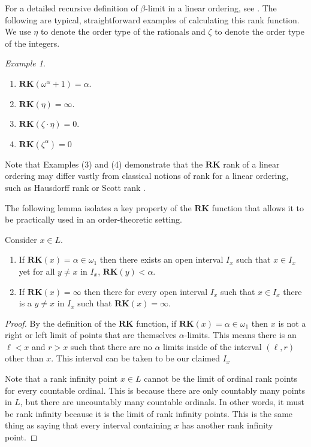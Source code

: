 \documentclass[11pt]{amsart}
\theoremstyle{remark}
\newtheorem{example}[thm]{Example}
\def\RK{\textbf{RK}}
\begin{document}
For a detailed recursive definition of $\beta$-limit in a linear ordering, see \cite[Chapter II.4]{MBook}. 
The following are typical, straightforward examples of calculating this rank function.
We use $\eta$ to denote the order type of the rationals and $\zeta$ to denote the order type of the integers.

\begin{example}

\begin{enumerate}
	\item $\RK(\omega^\alpha+1)=\alpha$.
	\item $\RK(\eta)=\infty$.
	\item $\RK(\zeta\cdot\eta) = 0$.
        \item $\RK(\zeta^\alpha)=0$
\end{enumerate}
\end{example}

Note that Examples (3) and (4) demonstrate that the $\RK$ rank of a linear ordering may differ vastly from classical notions of rank for a linear ordering, such as Hausdorff rank or Scott rank \cite{GR24}.

The following lemma isolates a key property of the $\RK$ function that allows it to be practically used in an order-theoretic setting.

\begin{lemma}\label{lem:RkTechnical}
Consider $x\in L$. 
\begin{enumerate}
	\item If $\RK(x)=\alpha\in\omega_1$ then there exists an open interval $I_x$ such that $x\in I_x$ yet for all $y\neq x$ in $I_x$, $\RK(y)<\alpha$.
	\item If $\RK(x)=\infty$ then there for every open interval $I_x$ such that $x\in I_x$ there is a $y\neq x$ in $I_x$ such that $\RK(x)=\infty$.
\end{enumerate}


\end{lemma}

\begin{proof}
By the definition of the $\RK$ function, if $\RK(x)=\alpha\in\omega_1$ then $x$ is not a right or left limit of points that are themselves $\alpha$-limits.
This means there is an $\ell<x$ and $r>x$ such that there are no $\alpha$ limits inside of the interval $(\ell,r)$ other than $x$.
This interval can be taken to be our claimed $I_x$

Note that a rank infinity point $x\in L$ cannot be the limit of ordinal rank points for every countable ordinal.
This is because there are only countably many points in $L$, but there are uncountably many countable ordinals.
In other words, it must be rank infinity because it is the limit of rank infinity points. 
This is the same thing as saying that every interval containing $x$ has another rank infinity point.
\end{proof}
\end{document}
